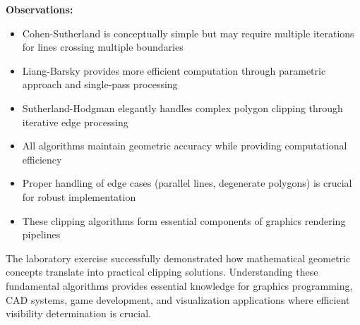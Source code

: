 \documentclass[12pt,a4paper]{article}
\begin{document}
\textbf{Observations:}
\begin{itemize}
    \item Cohen-Sutherland is conceptually simple but may require multiple iterations for lines crossing multiple boundaries
    \item Liang-Barsky provides more efficient computation through parametric approach and single-pass processing
    \item Sutherland-Hodgman elegantly handles complex polygon clipping through iterative edge processing
    \item All algorithms maintain geometric accuracy while providing computational efficiency
    \item Proper handling of edge cases (parallel lines, degenerate polygons) is crucial for robust implementation
    \item These clipping algorithms form essential components of graphics rendering pipelines
\end{itemize}

The laboratory exercise successfully demonstrated how mathematical geometric concepts translate into practical clipping solutions. Understanding these fundamental algorithms provides essential knowledge for graphics programming, CAD systems, game development, and visualization applications where efficient visibility determination is crucial.
\end{document}
